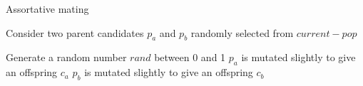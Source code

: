 \begin{algorithm}
    \caption{Assortative mating}
    Consider two parent candidates $p_a$ and $p_b$ randomly selected from $current-pop$
    \begin{algorithmic}[1]
        \State Generate a random number $rand$ between 0 and 1
        \Else
            \State $p_a$ is mutated slightly to give an offspring $c_a$
            \State $p_b$ is mutated slightly to give an offspring $c_b$
        \EndIf
    \end{algorithmic}
    \label{alg:assortative_mating}
\end{algorithm}
